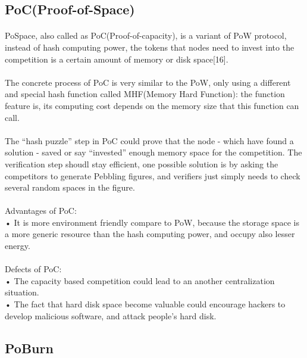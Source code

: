 \documentclass[]{article}
\begin{document}
\begin{CJK*}{UTF8}{gbsn}
\subsection{PoC(Proof-of-Space)}
	\paragraph{} 
	PoSpace, also called as PoC(Proof-of-capacity), is a variant of PoW protocol, instead of hash computing power, the tokens that nodes need to invest into the competition is a certain amount of memory or disk space[16].
	\paragraph{} 
	The concrete process of PoC is very similar to the PoW, only using a different and special hash function called MHF(Memory Hard Function): the function feature is, its computing cost depends on the memory size that this function can call.
	\paragraph{} 
	The ``hash puzzle'' step in PoC could prove that the node - which have found a solution - saved or say ``invested'' enough memory space for the competition. The verification step shoudl stay efficient, one possible solution is by asking the competitors to generate Pebbling figures, and verifiers just simply needs to check several random spaces in the figure. 
	\paragraph{} 
Advantages of PoC:
\\• It is more environment friendly compare to PoW, because the storage space is a more generic resource than the hash computing power, and occupy also lesser energy. 
	\paragraph{} 
Defects of PoC:
\\• The capacity based competition could lead to an another centralization situation.
\\• The fact that hard disk space become valuable could encourage hackers to develop malicious software, and attack people's hard disk.  

\subsection{PoBurn}

\end{CJK*}
\end{document}
